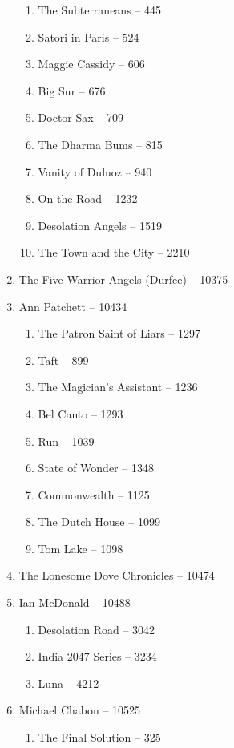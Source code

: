 \documentclass[a4paper, 11pt]{proc} %
\begin{document}
\begin{enumerate}
\begin{enumerate}
            \item The Subterraneans -- 445
            \item Satori in Paris -- 524
            \item Maggie Cassidy -- 606
            \item Big Sur -- 676
            \item Doctor Sax -- 709
            \item The Dharma Bums -- 815
            \item Vanity of Duluoz -- 940
            \item On the Road -- 1232
            \item Desolation Angels -- 1519
            \item The Town and the City -- 2210
        \end{enumerate}
    \item The Five Warrior Angels (Durfee) -- 10375
    \item Ann Patchett -- 10434
        \begin{enumerate}
            \item The Patron Saint of Liars -- 1297
            \item Taft -- 899
            \item The Magician's Assistant -- 1236
            \item Bel Canto -- 1293
            \item Run -- 1039
            \item State of Wonder -- 1348
            \item Commonwealth -- 1125
            \item The Dutch House -- 1099
            \item Tom Lake -- 1098
        \end{enumerate}
    \item The Lonesome Dove Chronicles -- 10474
    \item Ian McDonald -- 10488
        \begin{enumerate}
            \item Desolation Road -- 3042
            \item India 2047 Series -- 3234
            \item Luna -- 4212
        \end{enumerate}
    \item Michael Chabon -- 10525
        \begin{enumerate}
            \item The Final Solution -- 325

\end{enumerate}
\end{enumerate}
\end{document}
